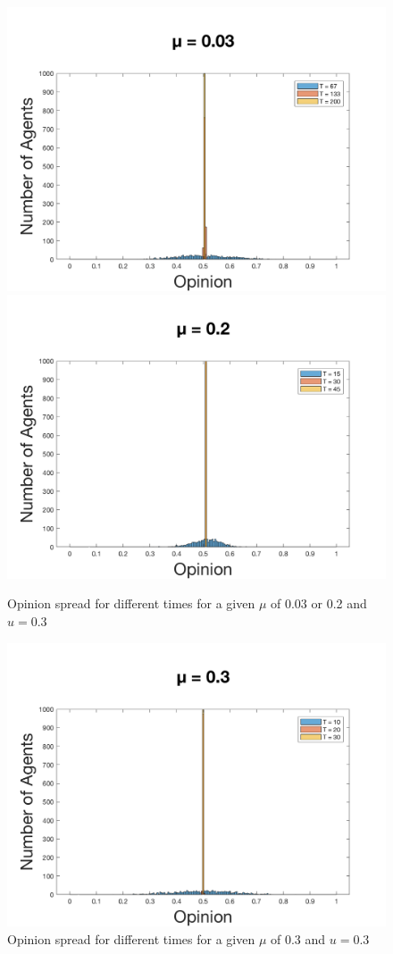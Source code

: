 \documentclass[11pt]{article}
\begin{document}
\begin{figure}[!htb]
  \includegraphics[width=\linewidth]{gen_plot_2017121418225017531e+01.png}
\endminipage\hfill
{}
  \includegraphics[width=\linewidth]{gen_plot_2017121418224358724e+01.png}
\endminipage
\caption{Opinion spread for different times for a given $\mu$ of 0.03 or 0.2 and $u = 0.3$}
\label{fig:muwithoutextremists}
\end{figure}

\begin{figure}
\center
 \includegraphics[width=0.6\linewidth]{gen_plot_2017121418225354249e+01.png}
\caption{Opinion spread for different times for a given $\mu$ of 0.3 and $u = 0.3$}
\label{fig:muwithoutextremists2}
\end{figure}
\end{document}
